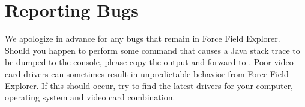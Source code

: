 \documentclass[letterpaper,11pt,english]{sphinxmanual}
\begin{document}
\section{Reporting Bugs}
\label{\detokenize{text/acknowledgements:reporting-bugs}}
\sphinxAtStartPar
We apologize in advance for any bugs that remain in Force Field Explorer. Should you happen to perform some command that causes a Java stack trace to be dumped to the console, please copy the output and forward to . Poor video card drivers can sometimes result in unpredictable behavior from Force Field Explorer. If this should occur, try to find the latest drivers for your computer, operating system and video card combination.



\renewcommand{\indexname}{Index}
\printindex
\end{document}
